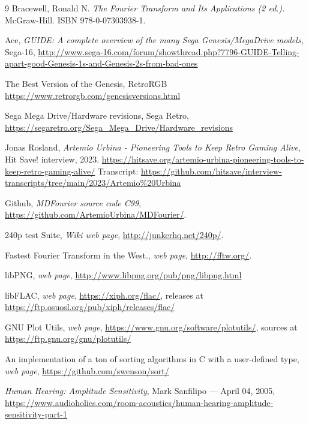 \documentclass[10pt,a4paper]{report}
\begin{document}
\begin{thebibliography}{9}
	Bracewell, Ronald N. 
	\textit{The Fourier Transform and Its Applications (2 ed.).}
	McGraw-Hill. ISBN 978-0-07303938-1.
	
	Ace, \textit{GUIDE: A complete overview of the many Sega Genesis/MegaDrive models}, Sega-16,
	\url{http://www.sega-16.com/forum/showthread.php?7796-GUIDE-Telling-apart-good-Genesis-1s-and-Genesis-2s-from-bad-ones}
	
	The Best Version of the Genesis, RetroRGB
	\url{https://www.retrorgb.com/genesisversions.html}
	
	Sega Mega Drive/Hardware revisions, Sega Retro,
	\url{https://segaretro.org/Sega_Mega_Drive/Hardware_revisions}
	
	Jonas Rosland, \textit{Artemio Urbina - Pioneering Tools to Keep Retro Gaming Alive}, Hit Save! interview, 2023.
	\url{https://hitsave.org/artemio-urbina-pioneering-tools-to-keep-retro-gaming-alive/}
	Transcript: \url{https://github.com/hitsave/interview-transcripts/tree/main/2023/Artemio\%20Urbina}

	Github,
	\textit{MDFourier source code C99},
	\url{https://github.com/ArtemioUrbina/MDFourier/}.
	
	240p test Suite,
	\textit{Wiki web page},
	\url{http://junkerhq.net/240p/}.
	
	Fastest Fourier Transform in the West.,
	\textit{web page},
	\url{http://fftw.org/}.
	
	libPNG,
	\textit{web page},
	\url{http://www.libpng.org/pub/png/libpng.html}
	
	libFLAC,
	\textit{web page},
	\url{https://xiph.org/flac/}, releases at \url{https://ftp.osuosl.org/pub/xiph/releases/flac/}
	
	GNU Plot Utils,
	\textit{web page},
	\url{https://www.gnu.org/software/plotutils/}, sources at \url{https://ftp.gnu.org/gnu/plotutils/}
	
	An implementation of a ton of sorting algorithms in C with a user-defined type,
	\textit{web page},
	\url{https://github.com/swenson/sort/}
	
	\textit{Human Hearing: Amplitude Sensitivity}, 
	Mark Sanfilipo — April 04, 2005,
	\url{https://www.audioholics.com/room-acoustics/human-hearing-amplitude-sensitivity-part-1}
	

\end{thebibliography}
\end{document}
